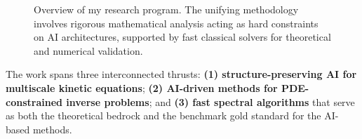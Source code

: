 \begin{figure}[H]
  \vspace{-1em}
  \caption{Overview of my research program. The unifying methodology involves rigorous mathematical analysis acting as hard constraints on AI architectures, supported by fast classical solvers for theoretical and numerical validation.}
\end{figure}

The work spans three interconnected thrusts: \textbf{(1)
structure-preserving AI for multiscale kinetic equations}; \textbf{(2)
AI-driven methods for PDE-constrained inverse problems}; and \textbf{(3)
fast spectral algorithms} that serve as both the theoretical bedrock and the
benchmark gold standard for the AI-based methods.
